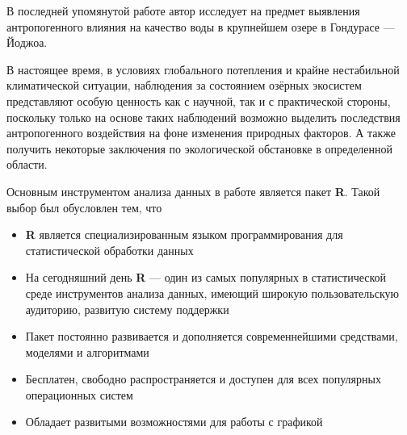 В последней упомянутой работе \cite{Chokshi2006} автор исследует на предмет выявления антропогенного влияния на качество воды в крупнейшем озере в Гондурасе --- Йоджоа.


В настоящее время, в условиях глобального потепления и крайне нестабильной климатической ситуации, наблюдения за состоянием озёрных экосистем представляют особую ценность как с научной, так и с практической стороны, поскольку только на основе таких наблюдений возможно выделить последствия антропогенного воздействия на фоне изменения природных факторов. А также получить некоторые заключения по экологической обстановке в определенной области.

Основным инструментом анализа данных в работе является пакет \textbf{R}. Такой выбор был обусловлен тем, что
\begin{itemize}
  \item \textbf{R} является специализированным языком программирования для статистической обработки данных
  \item На сегодняшний день \textbf{R} --- один из самых популярных в статистической среде инструментов анализа данных, имеющий широкую пользовательскую аудиторию, развитую систему поддержки
  \item Пакет постоянно развивается и дополняется современнейшими средствами, моделями и алгоритмами
  \item Бесплатен, свободно распространяется и доступен для всех популярных операционных систем
  \item Обладает развитыми возможностями для работы с графикой
\end{itemize}

